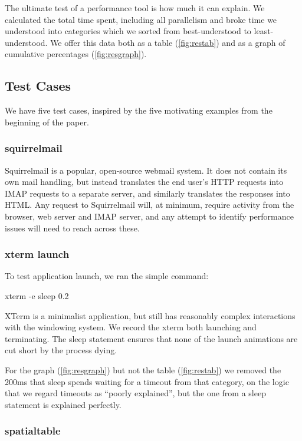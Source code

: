 \documentclass[10pt]{article}
\begin{document}
The ultimate test of a performance tool is how much it can explain.  We calculated the total time spent, including all parallelism and broke time we understood into categories which we sorted from best-understood to least-understood.  We offer this data both as a table (\ref{fig:restab}) and as a graph of cumulative percentages (\ref{fig:resgraph}).

\subsection{Test Cases}

We have five test cases, inspired by the five motivating examples from the beginning of the paper.

\subsubsection{squirrelmail}

Squirrelmail\cite{squirrelmail} is a popular, open-source webmail system.  It does not contain its own mail handling, but instead translates the end user's HTTP requests into IMAP requests to a separate server, and similarly translates the responses into HTML.  Any request to Squirrelmail will, at minimum, require activity from the browser, web server and IMAP server, and any attempt to identify performance issues will need to reach across these.

\subsubsection{xterm launch}

To test application launch, we ran the simple command:

\begin{tt} xterm -e sleep 0.2 \end{tt}

XTerm is a minimalist application, but still has reasonably complex interactions with the windowing system.  We record the xterm both launching and terminating.  The sleep statement ensures that none of the launch animations are cut short by the process dying.

For the graph (\ref{fig:resgraph}) but not the table (\ref{fig:restab}) we removed the 200ms that sleep spends waiting for a timeout from that category, on the logic that we regard timeouts as ``poorly explained'', but the one from a sleep statement is explained perfectly.

\subsubsection{spatialtable}
\end{document}
